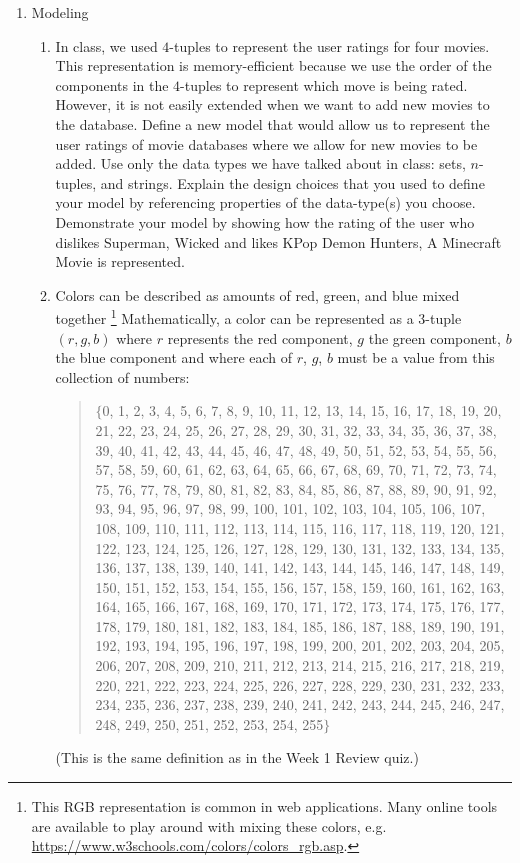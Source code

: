 \documentclass[12pt, oneside]{article}
\begin{document}
\begin{enumerate}[labelindent=0pt, leftmargin=0pt]
    \item Modeling
    \begin{enumerate}[labelindent=0pt, leftmargin=0pt]
        \item In class, we used $4$-tuples to represent the user ratings for four movies. 
        This representation is memory-efficient because we use the order of the components in the $4$-tuples to 
        represent which move is being rated. However, it is not easily extended when we want to add new movies to the database.
        Define a new model that would allow us to represent the user ratings of movie databases where we allow for new movies to be added.
        Use only the data types we have talked about in class: sets, $n$-tuples, and strings. Explain the design choices
        that you used to define your model by referencing properties of the data-type(s) you choose.
        Demonstrate your model by showing how the rating of the user who dislikes Superman, Wicked and likes KPop Demon Hunters, A Minecraft Movie is represented.
        
        \item
        Colors can be described as amounts of red, green, and blue mixed together
        \footnote{This RGB representation is common in web applications.  Many online tools are available to play around with mixing these colors,  e.g. \url{https://www.w3schools.com/colors/colors_rgb.asp}. }
        Mathematically, a color can be represented as a $3$-tuple $(r, g, b)$ where $r$ represents the red component, $g$ the green component, $b$ the blue component and where each of $r$, $g$, $b$ must be a value from this collection of numbers:
        \begin{quote}
        $\{$0, 1, 2, 3, 4, 5, 6, 7, 8, 9, 10, 11, 12, 13, 14, 15, 16, 17, 18, 19, 20, 21, 22, 23, 24, 25, 26, 27, 28, 29, 30, 31, 32, 33, 34, 35, 36, 37, 38, 39, 40, 41, 42, 43, 44, 45, 46, 47, 48, 49, 50, 51, 52, 53, 54, 55, 56, 57, 58, 59, 60, 61, 62, 63, 64, 65, 66, 67, 68, 69, 70, 71, 72, 73, 74, 75, 76, 77, 78, 79, 80, 81, 82, 83, 84, 85, 86, 87, 88, 89, 90, 91, 92, 93, 94, 95, 96, 97, 98, 99, 100, 101, 102, 103, 104, 105, 106, 107, 108, 109, 110, 111, 112, 113, 114, 115, 116, 117, 118, 119, 120, 121, 122, 123, 124, 125, 126, 127, 128, 129, 130, 131, 132, 133, 134, 135, 136, 137, 138, 139, 140, 141, 142, 143, 144, 145, 146, 147, 148, 149, 150, 151, 152, 153, 154, 155, 156, 157, 158, 159, 160, 161, 162, 163, 164, 165, 166, 167, 168, 169, 170, 171, 172, 173, 174, 175, 176, 177, 178, 179, 180, 181, 182, 183, 184, 185, 186, 187, 188, 189, 190, 191, 192, 193, 194, 195, 196, 197, 198, 199, 200, 201, 202, 203, 204, 205, 206, 207, 208, 209, 210, 211, 212, 213, 214, 215, 216, 217, 218, 219, 220, 221, 222, 223, 224, 225, 226, 227, 228, 229, 230, 231, 232, 233, 234, 235, 236, 237, 238, 239, 240, 241, 242, 243, 244, 245, 246, 247, 248, 249, 250, 251, 252, 253, 254, 255$\}$
        \end{quote}
        (This is the same definition as in the Week 1 Review quiz.)
        

\end{enumerate}
\end{enumerate}
\end{document}
